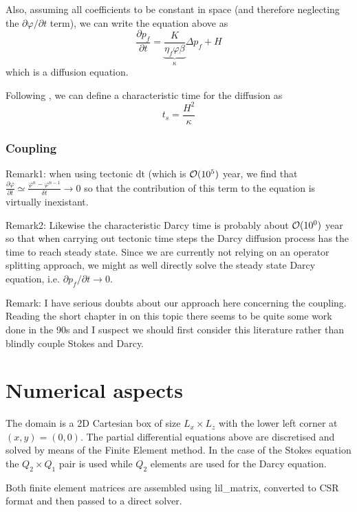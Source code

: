 \documentclass[a4paper]{article}
\newcommand{\python}{\color{darkgray} \sffamily }
\begin{document}
Also, assuming all coefficients to be constant in space (and 
therefore neglecting the $\partial\varphi/\partial t$ term), we can write the 
equation above as
\[
\frac{\partial p_f}{\partial t}
= \underbrace{\frac{K}{\eta_f \varphi \beta}}_{\kappa}  \Delta  p_f  + H
\]
which is a diffusion equation.

Following \textcite{wanu84}, we can define a characteristic time for the diffusion
as 
\[
t_s = \frac{H^2}{\kappa}
\]




\subsubsection{Coupling}

Remark1: 
when using tectonic dt (which is ${\cal{O}}(10^5)$ year, 
we find that $\frac{\partial \varphi}{\partial t}
\simeq \frac{\varphi^n -\varphi^{n-1}}{\delta t } \rightarrow 0$
so that the contribution of this term to the equation is 
virtually inexistant.

Remark2: Likewise the characteristic Darcy time is probably 
about ${\cal{O}}(10^0)$ year so that when carrying out 
tectonic time steps the Darcy diffusion process has the time 
to reach steady state. Since we are currently not
relying on an operator splitting approach, we might as well
directly solve the steady state Darcy equation, i.e.
$\partial p_f/\partial t \rightarrow 0$. 


Remark: I have serious doubts about our approach here 
concerning the coupling. Reading the short chapter in 
\textcite{tack10} on this topic there seems to be quite some 
work done in the 90s and I suspect we should first 
consider this literature rather than blindly couple 
Stokes and Darcy. 


\newpage
\section{Numerical aspects}

The domain is a 2D Cartesian box of size $L_x \times L_z$
with the lower left corner at $(x,y)=(0,0)$.
The partial differential equations above are discretised and
solved by means of the Finite Element method.
In the case of the Stokes equation the $Q_2\times Q_1$ 
pair is used \textcite{thba22} while $Q_2$
elements are used for the Darcy equation.

Both finite element matrices are assembled using {\python lil\_matrix},
converted to CSR format and then passed to a direct solver.
\end{document}
